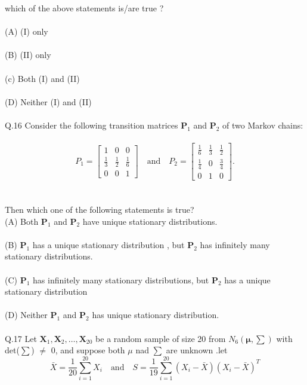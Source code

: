 \documentclass{book}[200pt]
\begin{document}
{which of the above statements is/are true ?\\
\\
(A) (I) only\\
\\
(B) (II) only\\
\\
(c) Both (I) and (II)\\
\\
(D) Neither (I) and (II)\\
\\
Q.16 Consider the following transition matrices $ \textbf{P}_1$ and $\textbf{P}_2$ of two Markov chains:\\
\\
\[
P_1 = 
\begin{bmatrix}
	1 & 0 & 0 \\
	\frac{1}{3} & \frac{1}{2} & \frac{1}{6} \\
	0 & 0 & 1
\end{bmatrix}
\quad \text{and} \quad
P_2 = 
\begin{bmatrix}
	\frac{1}{6} & \frac{1}{3} & \frac{1}{2} \\
	\frac{1}{4} & 0 & \frac{3}{4} \\
	0 & 1 & 0
\end{bmatrix}.
\]\\
\\
Then which one of the following statements is true?\\
(A) Both $\textbf{P}_1$ and $\textbf{P}_2$ have unique stationary distributions.\\
\\
(B) $\textbf{P}_1$ has a unique stationary distribution , but $\textbf{P}_2$ has infinitely many stationary distributions.\\
\\
(C) $\textbf{P}_1$ has infinitely many 	stationary distributions, but $\textbf{P}_2$ has a unique stationary distribution\\
\\
(D) Neither $\textbf{P}_1$ and $\textbf{P}_2$ has unique stationary distribution.\\
\\
Q.17 Let $\textbf{X}_1, \textbf{X}_2, \dots,\textbf{X}_20$ be a random sample of size 20 from $N_6(\mathbf{\mu,\sum})$ with det($\sum$) $\neq$ 0, and suppose both $\mu$ nad  $\sum$ are unknown .let \\
$$
\bar{X} = \frac{1}{20}\sum_{i=1}^{20} X_i 
\quad \text{and} \quad
S = \frac{1}{19} \sum_{i=1}^{20} (X_i - \bar{X})(X_i - \bar{X})^T
$$}
\end{document}
